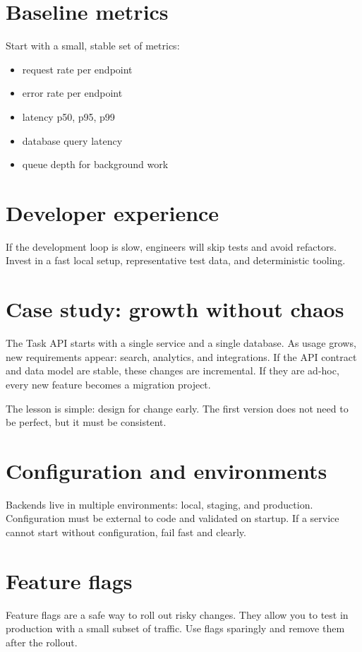 \section{Baseline metrics}
Start with a small, stable set of metrics:
\begin{itemize}[nosep]
  \item request rate per endpoint
  \item error rate per endpoint
  \item latency p50, p95, p99
  \item database query latency
  \item queue depth for background work
\end{itemize}

\section{Developer experience}
If the development loop is slow, engineers will skip tests and avoid refactors.
Invest in a fast local setup, representative test data, and deterministic tooling.

\section{Case study: growth without chaos}
The Task API starts with a single service and a single database.
As usage grows, new requirements appear: search, analytics, and integrations.
If the API contract and data model are stable, these changes are incremental.
If they are ad-hoc, every new feature becomes a migration project.

The lesson is simple: design for change early.
The first version does not need to be perfect, but it must be consistent.

\section{Configuration and environments}
Backends live in multiple environments: local, staging, and production.
Configuration must be external to code and validated on startup.
If a service cannot start without configuration, fail fast and clearly.

\section{Feature flags}
Feature flags are a safe way to roll out risky changes.
They allow you to test in production with a small subset of traffic.
Use flags sparingly and remove them after the rollout.

